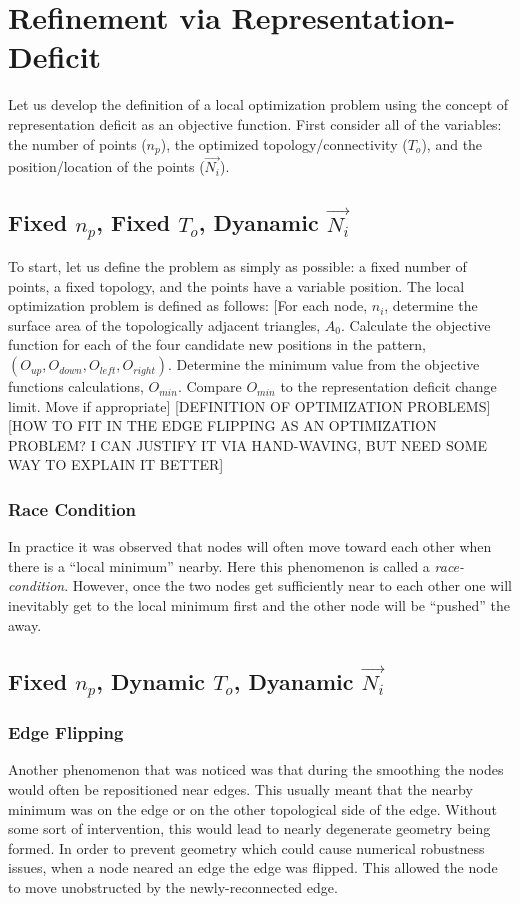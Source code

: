 \documentclass[11pt]{article}
\begin{document}
\section{Refinement via Representation-Deficit}
Let us develop the definition of a local optimization problem using the
concept of representation deficit as an objective function. First
consider all of the variables: the number of points ($n_p$), the
optimized topology/connectivity ($T_o$), and the position/location of
the points ($\vec{N_i}$).
\subsection{Fixed $n_p$, Fixed $T_o$, Dyanamic $\vec{N_i}$}
To start, let us define the problem as simply as possible: a fixed
number of points, a fixed topology, and the points have a variable
position.  The local optimization problem is defined as follows: [For
each node, $n_i$, determine the surface area of the topologically
adjacent triangles, $A_0$. Calculate the objective function for each of
the four candidate new positions in the pattern, $\left(O_{up},
O_{down}, O_{left}, O_{right}\right)$. Determine the minimum value from
the objective functions calculations, $O_{min}$. Compare $O_{min}$ to
the representation deficit change limit. Move if appropriate]
[DEFINITION OF OPTIMIZATION PROBLEMS]
[HOW TO FIT IN THE EDGE FLIPPING AS AN OPTIMIZATION PROBLEM? I CAN
JUSTIFY IT VIA HAND-WAVING, BUT NEED SOME WAY TO EXPLAIN IT BETTER]
\subsubsection{Race Condition}
In practice it was observed that nodes will often move toward each other
when there is a ``local minimum'' nearby. Here this phenomenon is called
a {\it race-condition}. However, once the two nodes get sufficiently
near to each other one will inevitably get to the local minimum first
and the other node will be ``pushed'' the away.
\subsection{Fixed $n_p$, Dynamic $T_o$, Dyanamic $\vec{N_i}$}
\subsubsection{Edge Flipping}
Another phenomenon that was noticed was that during the smoothing the
nodes would often be repositioned near edges. This usually meant that
the nearby minimum was on the edge or on the other topological side of
the edge. Without some sort of intervention, this would lead to nearly
degenerate geometry being formed. In order to prevent geometry which
could cause numerical robustness issues, when a node neared an edge the
edge was flipped. This allowed the node to move unobstructed by the
newly-reconnected edge.
\end{document}
